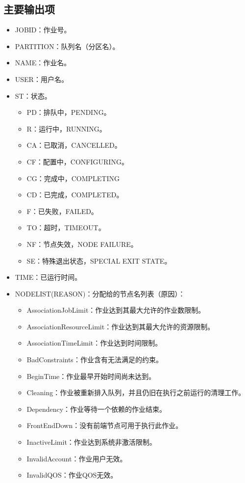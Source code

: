 \subsection{主要输出项}
\begin{itemize}
	\item JOBID：作业号。
	\item PARTITION：队列名（分区名）。
	\item NAME：作业名。
	\item USER：用户名。
	\item ST：状态。
\begin{itemize}
	\item PD：排队中，PENDING。
	\item R：运行中，RUNNING。
	\item CA：已取消，CANCELLED。
	\item CF：配置中，CONFIGURING。
	\item CG：完成中，COMPLETING
	\item CD：已完成，COMPLETED。
	\item F：已失败，FAILED。
	\item TO：超时，TIMEOUT。
	\item NF：节点失效，NODE FAILURE。
	\item SE：特殊退出状态，SPECIAL EXIT STATE。
\end{itemize}
	\item TIME：已运行时间。
	\item NODELIST(REASON)：分配给的节点名列表（原因）：
\begin{itemize}
	\item AssociationJobLimit：作业达到其最大允许的作业数限制。
    \item AssociationResourceLimit：作业达到其最大允许的资源限制。
    \item AssociationTimeLimit：作业达到时间限制。
    \item BadConstraints：作业含有无法满足的约束。
    \item BeginTime：作业最早开始时间尚未达到。
    \item Cleaning：作业被重新排入队列，并且仍旧在执行之前运行的清理工作。
    \item Dependency：作业等待一个依赖的作业结束。
    \item FrontEndDown：没有前端节点可用于执行此作业。
    \item InactiveLimit：作业达到系统非激活限制。
    \item InvalidAccount：作业用户无效。
    \item InvalidQOS：作业QOS无效。

\end{itemize}
\end{itemize}
